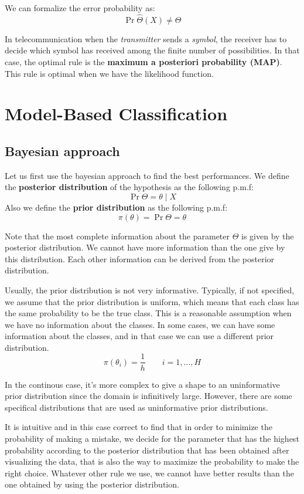 We can formalize the error probability as:
\[
    \Pr{\hat{\Theta}(X) \neq \Theta }
\]

In telecommunication when the \textit{transmitter} sends a \textit{symbol}, the receiver has to decide which symbol has received among the finite number of possibilities. In that case, the optimal rule is the \textbf{maximum a posteriori probability (MAP)}. This rule is optimal when we have the likelihood function.

\section{Model-Based Classification}

\subsection{Bayesian approach}
Let us first use the bayesian approach to find the best performances. We define the \textbf{posterior distribution} of the hypothesis as the following p.m.f:
\[
    \Pr{\Theta = \theta \mid X}
\]
Also we define the \textbf{prior distribution} as the following p.m.f:
\[
    \pi(\theta) = \Pr{\Theta = \theta}
\]

Note that the most complete information about the parameter $\Theta$ is given by the posterior distribution. We cannot have more information than the one give by this distribution. Each other information can be derived from the posterior distribution.

Usually, the prior distribution is not very informative. Typically, if not specified, we assume that the prior distribution is uniform, which means that each class has the same probability to be the true class. This is a reasonable assumption when we have no information about the classes. In some cases, we can have some information about the classes, and in that case we can use a different prior distribution.
\[
    \pi(\theta_i) = \frac 1h\qquad i = 1, \dots, H
\]

In the continous case, it's more complex to give a shape to an uninformative prior distribution since the domain is infinitively large. However, there are some specifical distributions that are used as uninformative prior distributions.

It is intuitive and in this case correct to find that in order to minimize the probability of making a mistake, we decide for the parameter that has the highest probability according to the posterior distribution that has been obtained after visualizing the data, that is also the way to maximize the probability to make the right choice. Whatever other rule we use, we cannot have better results than the one obtained by using the posterior distribution.

